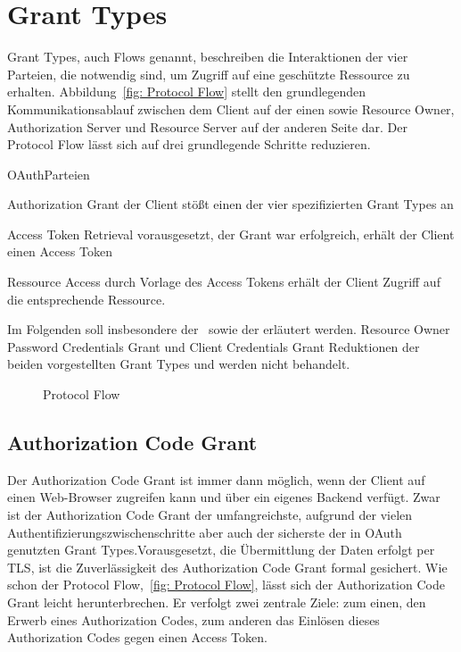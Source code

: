 \section{\glspl{Grant Type}}\label{GrantTypes} \glspl{Grant Type}, auch Flows
genannt, beschreiben die Interaktionen der vier Parteien, die notwendig sind, um
Zugriff auf eine geschützte Ressource zu erhalten. Abbildung~\ref{fig: Protocol
Flow} stellt den grundlegenden Kommunikationsablauf zwischen dem Client auf der
einen sowie Resource Owner, Authorization Server und Resource Server auf der
anderen Seite dar. Der Protocol Flow lässt sich auf drei grundlegende Schritte
reduzieren.

\begin{labeling}{OAuthParteien}
    \item [Authorization Grant] der Client stößt einen der vier spezifizierten
    \glspl{Grant Type} an
    \item [Access Token Retrieval] vorausgesetzt, der Grant war erfolgreich,
    erhält der Client einen Access Token
    \item [Ressource Access] durch Vorlage des Access Tokens erhält der Client
    Zugriff auf die entsprechende Ressource.
\end{labeling}


Im Folgenden soll insbesondere der~ sowie der
 erläutert werden. Resource Owner Password Credentials
Grant und Client Credentials Grant Reduktionen der beiden vorgestellten
\glspl{Grant Type} und werden nicht behandelt.

\begin{figure}[h]
    \scalebox{.7} {
        
    }
    \caption{Protocol Flow}\label{fig: Protocol Flow}
\end{figure} 
\subsection{Authorization Code Grant}\label{ssec:authcode} Der Authorization
Code Grant ist immer dann möglich, wenn der Client auf einen Web-Browser
zugreifen kann und über ein eigenes Backend verfügt. Zwar ist der Authorization
Code Grant der umfangreichste, aufgrund der vielen
Authentifizierungszwischenschritte aber auch der sicherste der in \gls{OAuth}
genutzten \glspl{Grant Type}.Vorausgesetzt, die Übermittlung der Daten erfolgt
per \gls{TLS}, ist die Zuverlässigkeit des Authorization Code Grant formal
gesichert.\cite{Chari.2011} Wie schon der Protocol Flow,~\ref{fig: Protocol
Flow}, lässt sich der Authorization Code Grant leicht herunterbrechen. Er
verfolgt zwei zentrale Ziele: zum einen, den Erwerb eines Authorization Codes,
zum anderen das Einlösen dieses Authorization Codes gegen einen Access Token.

